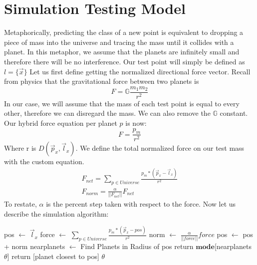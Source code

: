 \documentclass[journal]{IEEEtran}
\begin{document}
\section{Simulation Testing Model}
Metaphorically, predicting the class of a new point is equivalent to dropping a piece of mass into the universe and tracing the mass until it collides with a planet. In this metaphor, we assume that the planets are infinitely small and therefore there will be no interference. Our test point will simply be defined as $l = \{\overrightarrow{x}\}$ Let us first define getting the normalized directional force vector. Recall from physics that the gravitational force between two planets is
\begin{equation}
F = \mathbb{G}\frac{m_1m_2}{r^2}
\end{equation}
In our case, we will assume that the mass of each test point is equal 
to every other, therefore we can disregard the mass. We can also remove the $\mathbb{G}$ constant. Our hybrid force equation per planet $p$ is now:
\begin{equation}
F = \frac{p_m}{r^2}
\end{equation}
Where r is $D(\overrightarrow{p}_x,\overrightarrow{l}_x)$. We define the total normalized force on our test mass with the custom equation. 
\begin{equation}
\begin{array}
		{lcl} 
		 F_{net} = \sum_{p \in Universe}\frac{p_m*(\overrightarrow{p}_x -\overrightarrow{l}_x)}{r^2} \\
		 F_{norm} = \frac{\alpha}{||F_{net}||} F_{net}
	\end{array}
\end{equation}
To restate, $\alpha$ is the percent step taken with respect to the force. 
Now let us describe the simulation algorithm:

\begin{algorithm}
  pos $\leftarrow$ $\overrightarrow{l}_x$\;
  {
	force $\leftarrow$ $\sum_{p \in Universe}\frac{p_m*(\overrightarrow{p}_x - pos)}{r^2}$ \;
	\;
	 norm $\leftarrow$ $\frac{\alpha}{||force||} force$ \;
	 pos $\leftarrow$ pos + norm
  }
  nearplanets $\leftarrow$ Find Planets in Radius of pos\;
 {
 	return $\mathbf{mode}$[nearplanets $\theta$]
 }
 {
 return [planet closest to pos] $\theta$
 }
\end{algorithm}
\end{document}
